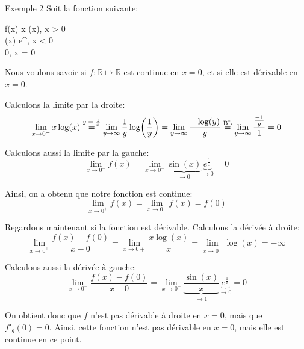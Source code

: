 \documentclass[a4paper]{article}
\begin{document}
\begin{parag}{Exemple 2}
    Soit la fonction suivante:
    \begin{functionbypart}{f\left(x\right)}
        x \log\left(x\right), \mathspace x > 0  \\
        \sin\left(x\right) e^{}, \mathspace x < 0 \\
        0, \mathspace x = 0
    \end{functionbypart}

    Nous voulons savoir si $f : \mathbb{R} \mapsto \mathbb{R}$ est continue en $x = 0$, et si elle est dérivable en $x = 0$.

    Calculons la limite par la droite: 
    \[\lim_{x \to 0^+} x \log\left(x\right) \over{=}{$y = \frac{1}{x}$} \lim_{y \to \infty} \frac{1}{y} \log\left(\frac{1}{y}\right) = \lim_{y \to \infty} \frac{-\log\left(y\right)}{y} \over{=}{BL} \lim_{y \to \infty} \frac{\frac{-1}{y}}{1} = 0 \]

    Calculons aussi la limite par la gauche: 
    \[\lim_{x \to 0^-} f\left(x\right) = \lim_{x \to 0^-} \underbrace{\sin\left(x\right)}_{\to 0} \underbrace{e^{\frac{1}{x}}}_{\to 0} = 0\]
    
    Ainsi, on a obtenu que notre fonction est continue: 
    \[\lim_{x \to 0^+} f\left(x\right) = \lim_{x \to 0^-} f\left(x\right) = f\left(0\right)\]
    
    Regardons maintenant si la fonction est dérivable. Calculons la dérivée à droite: 
    \[\lim_{x \to 0^+} \frac{f\left(x\right) - f\left(0\right)}{x - 0} = \lim_{x \to 0+} \frac{x\log\left(x\right)}{x} = \lim_{x \to 0^+} \log\left(x\right) = -\infty\]

    Calculons aussi la dérivée à gauche: 
    \[\lim_{x \to 0^-} \frac{f\left(x\right)-f\left(0\right)}{x - 0} = \lim_{x \to 0^-} \underbrace{\frac{\sin\left(x\right)}{x}}_{\to 1} \underbrace{e^{\frac{1}{x}}}_{\to 0} = 0\]
    
    On obtient donc que $f$ n'est pas dérivable à droite en $x = 0$, mais que $f'_g\left(0\right) = 0$. Ainsi, cette fonction n'est pas dérivable en $x = 0$, mais elle est continue en ce point.
\end{parag}
\end{document}

